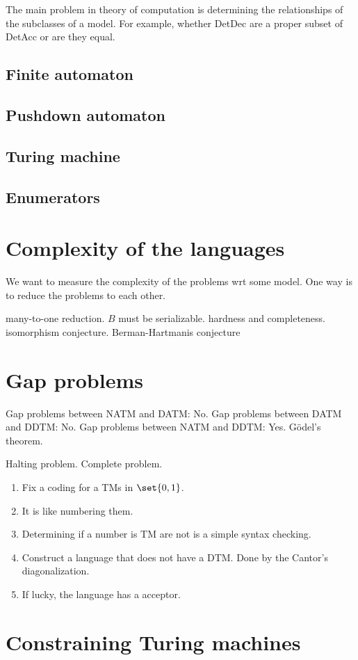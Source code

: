 The main problem in theory of computation is determining the relationships of the subclasses of a model. For example, whether DetDec are a proper subset of DetAcc or are they equal. 


\subsection{Finite automaton}
\subsection{Pushdown automaton}
\subsection{Turing machine}
\subsection{Enumerators}
\section{Complexity of the languages}
We want to measure the complexity of the problems wrt some model. One way is to reduce the problems to each other.

many-to-one reduction. \(B\) must be serializable.
hardness and completeness.
isomorphism conjecture. Berman-Hartmanis conjecture
\section{Gap problems}
Gap problems between NATM and DATM: No.
Gap problems between DATM and DDTM: No.
Gap problems between NATM and DDTM: Yes. G\"{o}del's theorem.

Halting problem. Complete problem.

\begin{enumerate}
    \item Fix a coding for a TMs in \(\set{0,1}\).
    \item It is like numbering them.
    \item Determining if a number is TM are not is a simple syntax checking.
    \item Construct a language that does not have a DTM. Done by the Cantor's diagonalization.
    \item If lucky, the language has a acceptor.
\end{enumerate}

\section{Constraining Turing machines}
